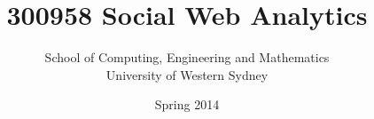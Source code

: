 \title{300958 Social Web Analytics}
\author{School of Computing, Engineering and Mathematics\\University of Western Sydney}
\date{Spring 2014}




\renewcommand{\subsubsection}[1]{\paragraph{#1}}

\usepackage{fancyvrb}
\usepackage{xspace}
\usepackage{fullwidth}


\newcommand{\openepigraph}[2]{%
  \begin{fullwidth}
  \sffamily\large
  \begin{doublespace}
  \noindent\allcaps{#1}\\%
  \noindent\allcaps{#2}%
  \end{doublespace}
  \end{fullwidth}
}

\newcommand{\blankpage}{\newpage\hbox{}\thispagestyle{empty}\newpage}

\newcommand{\monthyear}{%
  \ifcase\month\or January\or February\or March\or April\or May\or June\or
  July\or August\or September\or October\or November\or
  December\fi\space\number\year
}

\usepackage{units}




\frontmatter

\thispagestyle{empty}
\maketitle


\newpage
\thispagestyle{empty}
~

\vfill

